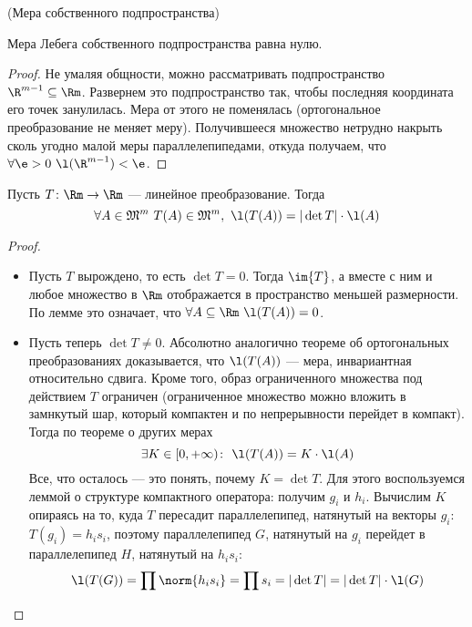 \begin{lemma}(Мера собственного подпространства)
	
	Мера Лебега собственного подпространства равна нулю.
\end{lemma}
\begin{proof}
	Не умаляя общности, можно рассматривать подпространство \\ $\R^{m - 1} \subseteq \Rm$.
	Развернем это подпространство так, чтобы последняя координата его точек занулилась.
	Мера от этого не поменялась (ортогональное преобразование не меняет меру). Получившееся
	множество нетрудно накрыть сколь угодно малой меры параллелепипедами, откуда получаем,
	что $\forall \e > 0~ \l(\R^{m - 1}) < \e$.
\end{proof}

\begin{theorem}
	Пусть $T \colon \Rm \to \Rm$ --- линейное преобразование. Тогда
\[
	\forall A \in \mathfrak{M}^m~ T(A) \in \mathfrak{M}^m,~ \l(T(A)) 
	= |\det{T}|\cdot \l(A)
\]
\end{theorem}
\begin{proof}
	\enewline
	\begin{itemize}
		\item Пусть $T$ вырождено, то есть $\det{T} = 0$. Тогда 
			$\im{T}$, а вместе с ним и любое множество в $\Rm$
			отображается в пространство меньшей размерности. По лемме 
			это означает, что $\forall A \subseteq \Rm~ \l(T(A)) = 0$.
		\item Пусть теперь $\det{T} \neq 0$. Абсолютно аналогично теореме
			об ортогональных преобразованиях доказывается, что 
			$\l(T(A))$ --- мера, инвариантная относительно сдвига. Кроме того,
			образ ограниченного множества под действием $T$ ограничен 
			(ограниченное множество можно вложить в замнкутый шар, 
			который компактен и по непрерывности перейдет в компакт).
			Тогда по теореме о других мерах
\[
	\exists K \in [0, +\infty)\colon~ \l(T(A)) = K \cdot \l(A)
\]
			Все, что осталось --- это понять, почему $K = \det{T}$. Для этого
			воспользуемся леммой о структуре компактного оператора: получим
			$g_i$ и $h_i$. Вычислим $K$ опираясь на то, куда $T$ пересадит 
			параллелепипед, натянутый на векторы $g_i$: $T(g_i) = h_i s_i$, 
			поэтому параллелепипед $G$, натянутый на $g_i$ перейдет в 
			параллелепипед $H$, натянутый на $h_i s_i$:
\[
	\l(T(G)) = \prod{\norm{h_i s_i}} = \prod{s_i} = |\det{T}| = |\det{T}| \cdot \l(G) 
\]
	\end{itemize}
\end{proof}

\let\x\undefined
\let\y\undefined
\let\h\undefined
\let\w\undefined
\let\z\undefined
\let\Od\undefined
\let\N\undefined
\let\C\undefined
